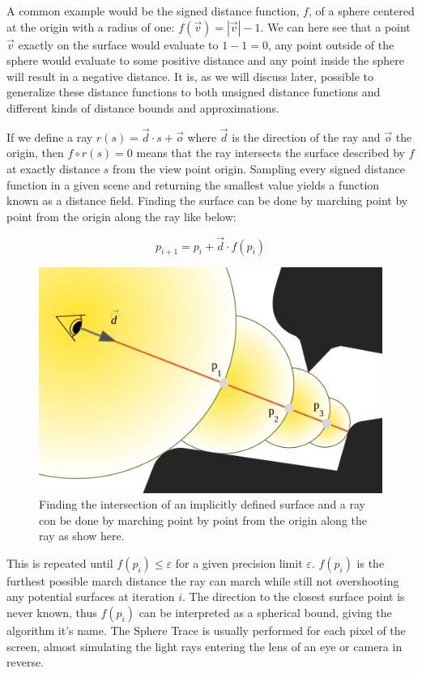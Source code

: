 		A common example would be the signed distance function, $f$, of a
		sphere centered at the origin with a radius of one: $f(\vec{v}) =
		|\vec{v}| - 1$. We can here see that a point $\vec{v}$ exactly on the
		surface would evaluate to $1-1=0$, any point outside of the sphere
		would evaluate to some positive distance and any point inside the
		sphere will result in a negative distance. It is, as we will discuss
		later, possible to generalize these distance functions to both unsigned
		distance functions and different kinds of distance bounds and
		approximations.

		If we define a ray $r(s) = \vec{d} \cdot s + \vec{o}$ where $\vec{d}$
		is the direction of the ray and $\vec{o}$ the origin, then $f\circ r(s)
		= 0$ means that the ray intersects the surface described by $f$ at
		exactly distance $s$ from the view point origin. Sampling every signed
		distance function in a given scene and returning the smallest value
		yields a function known as a distance field. Finding the surface can be
		done by marching point by point from the origin along the ray like
		below: 
		
		$$p_{i+1} = p_i + \vec{d}\cdot f(p_i)$$ 
		
		\begin{figure}
			\centering
			\includegraphics[width=0.75\linewidth]{figure/SDF2}
			\caption{Finding the intersection of an implicitly defined surface
				and a ray con be done by marching point by point from the 
				origin along the ray as show here.}
		\end{figure}

		This is repeated until $f(p_i) \leq \varepsilon$ for a given precision
		limit $\varepsilon$. $f(p_i)$ is the furthest possible march distance
		the ray can march while still not overshooting any potential surfaces
		at iteration $i$. The direction to the closest surface point is never
		known, thus $f(p_i)$ can be interpreted as a spherical bound, giving
		the algorithm it's name. The Sphere Trace is usually performed for each
		pixel of the screen, almost simulating the light rays entering the
		lens of an eye or camera in reverse.
		
